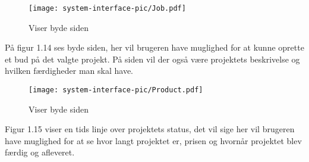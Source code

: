 \newpage
\begin{figure}[ht]
    \centering
\texttt{[image: system-interface-pic/Job.pdf]}
\caption{Viser byde siden}
\label{fig:figure2}
\end{figure}

På figur 1.14 ses byde siden, her vil brugeren have muglighed for at kunne oprette et bud på det valgte projekt. På siden vil der også være projektets beskrivelse og hvilken færdigheder man skal have. 

\begin{figure}[ht]
    \centering
\texttt{[image: system-interface-pic/Product.pdf]}
\caption{Viser byde siden}
\label{fig:figure2}
\end{figure}

Figur 1.15 viser en tids linje over projektets status, det vil sige her vil brugeren have muglighed for at se hvor langt projektet er, prisen og hvornår projektet blev færdig og afleveret. 